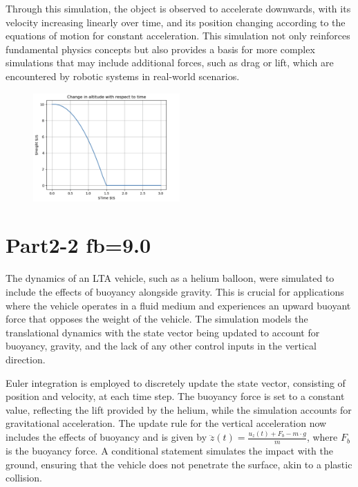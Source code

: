 \documentclass[letterpaper, 10 pt, conference]{ieeeconf}  %
\begin{document}
Through this simulation, the object is observed to accelerate downwards, with its velocity increasing linearly over time, and its position changing according to the equations of motion for constant acceleration. This simulation not only reinforces fundamental physics concepts but also provides a basis for more complex simulations that may include additional forces, such as drag or lift, which are encountered by robotic systems in real-world scenarios.

\begin{figure}[htbp]
    \centering
    \includegraphics[width=0.5\textwidth]{image3.png}
\end{figure}

\section{Part2-2 fb=9.0}

The dynamics of an LTA vehicle, such as a helium balloon, were simulated to include the effects of buoyancy alongside gravity. This is crucial for applications where the vehicle operates in a fluid medium and experiences an upward buoyant force that opposes the weight of the vehicle. The simulation models the translational dynamics with the state vector being updated to account for buoyancy, gravity, and the lack of any other control inputs in the vertical direction.

Euler integration is employed to discretely update the state vector, consisting of position and velocity, at each time step. The buoyancy force is set to a constant value, reflecting the lift provided by the helium, while the simulation accounts for gravitational acceleration. The update rule for the vertical acceleration now includes the effects of buoyancy and is given by \( \ddot{z}(t) = \frac{u_z(t) + F_b - m \cdot g}{m} \), where \( F_b \) is the buoyancy force. A conditional statement simulates the impact with the ground, ensuring that the vehicle does not penetrate the surface, akin to a plastic collision.
\end{document}
